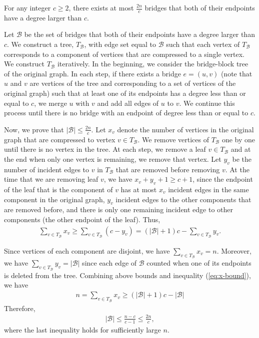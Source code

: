\begin{lemma}\label{lem:few-high-deg-bridges}
For any integer $c \geq 2$, there exists at most $\frac{2n}{c}$ bridges that both of their endpoints have a degree larger than $c$. 
\end{lemma}
\begin{myproof}
Let $\mathcal{B}$ be the set of bridges that both of their endpoints have a degree larger than $c$. We construct a tree, $T_\mathcal{B}$, with edge set equal to $\mathcal{B}$ such that each vertex of $T_\mathcal{B}$ corresponds to a component of vertices that are compressed to a single vertex. We construct $T_\mathcal{B}$ iteratively. In the beginning, we consider the bridge-block tree of the original graph. In each step, if there exists a bridge $e = (u,v)$ (note that $u$ and $v$ are vertices of the tree and corresponding to a set of vertices of the original graph) such that at least one of its endpoints has a degree less than or equal to $c$, we merge $u$ with $v$ and add all edges of $u$ to $v$. We continue this process until there is no bridge with an endpoint of degree less than or equal to $c$.

Now, we prove that $|\mathcal{B}| \leq \frac{2n}{c}$. Let $x_v$ denote the number of vertices in the original graph that are compressed to vertex $v \in T_\mathcal{B}$. We remove vertices of $T_\mathcal{B}$ one by one until there is no vertex in the tree. At each step, we remove a leaf $v \in T_\mathcal{B}$ and at the end when only one vertex is remaining, we remove that vertex. Let $y_v$ be the number of incident edges to $v$ in $T_\mathcal{B}$ that are removed before removing $v$. At the time that we are removing leaf $v$, we have $x_v + y_v + 1\geq c + 1$, since the endpoint of the leaf that is the component of $v$ has at most $x_v$ incident edges in the same component in the original graph, $y_v$ incident edges to the other components that are removed before, and there is only one remaining incident edge to other components (the other endpoint of the leaf). Thus, 
\begin{align}\label{eq:x-bound}
    \sum_{v \in T_\mathcal{B}} x_v \geq \sum_{v \in T_\mathcal{B}} (c - y_v) = (|\mathcal{B}| + 1)c - \sum_{v \in T_\mathcal{B}}y_v.
\end{align}

Since vertices of each component are disjoint, we have $\sum_{v \in T_\mathcal{B}} x_v = n$. Moreover, we have $\sum_{v \in T_\mathcal{B}} y_v = |\mathcal{B}|$ since each edge of $\mathcal{B}$ counted when one of its endpoints is deleted from the tree. Combining above bounds and inequality (\ref{eq:x-bound}), we have
\begin{align*}
    n = \sum_{v \in T_\mathcal{B}} x_v \geq  (|\mathcal{B}| + 1)c - |\mathcal{B}|
\end{align*}
Therefore,
\begin{align*}
    |\mathcal{B}| \leq \frac{n - c}{c - 1} \leq \frac{2n}{c},
\end{align*}
where the last inequality holds for sufficiently large $n$.
\end{myproof}

